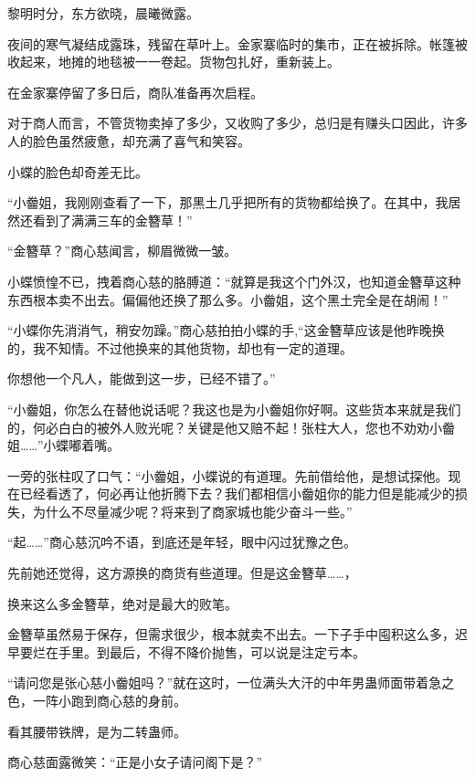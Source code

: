 
\begin{this_body}



黎明时分，东方欲晓，晨曦微露。

夜间的寒气凝结成露珠，残留在草叶上。金家寨临时的集市，正在被拆除。帐篷被收起来，地摊的地毯被一一卷起。货物包扎好，重新装上。

在金家寨停留了多日后，商队准备再次启程。

对于商人而言，不管货物卖掉了多少，又收购了多少，总归是有赚头口因此，许多人的脸色虽然疲惫，却充满了喜气和笑容。

小蝶的脸色却奇差无比。

“小齤姐，我刚刚查看了一下，那黑土几乎把所有的货物都给换了。在其中，我居然还看到了满满三车的金簪草！”

“金簪草？”商心慈闻言，柳眉微微一皱。

小蝶愤惶不已，拽着商心慈的胳膊道：“就算是我这个门外汉，也知道金簪草这种东西根本卖不出去。偏偏他还换了那么多。小齤姐，这个黑土完全是在胡闹！”

“小蝶你先消消气，稍安勿躁。”商心慈拍拍小蝶的手,“这金簪草应该是他昨晚换的，我不知情。不过他换来的其他货物，却也有一定的道理。

你想他一个凡人，能做到这一步，已经不错了。”

“小齤姐，你怎么在替他说话呢？我这也是为小齤姐你好啊。这些货本来就是我们的，何必白白的被外人败光呢？关键是他又赔不起！张柱大人，您也不劝劝小齤姐……”小蝶嘟着嘴。

一旁的张柱叹了口气：“小齤姐，小蝶说的有道理。先前借给他，是想试探他。现在已经看透了，何必再让他折腾下去？我们都相信小齤姐你的能力但是能减少的损失，为什么不尽量减少呢？将来到了商家城也能少奋斗一些。”

“起……”商心慈沉吟不语，到底还是年轻，眼中闪过犹豫之色。

先前她还觉得，这方源换的商货有些道理。但是这金簪草……，

换来这么多金簪草，绝对是最大的败笔。

金簪草虽然易于保存，但需求很少，根本就卖不出去。一下子手中囤积这么多，迟早要烂在手里。到最后，不得不降价抛售，可以说是注定亏本。

“请问您是张心慈小齤姐吗？”就在这时，一位满头大汗的中年男蛊师面带着急之色，一阵小跑到商心慈的身前。

看其腰带铁牌，是为二转蛊师。

商心慈面露微笑：“正是小女子请问阁下是？”


\end{this_body}
